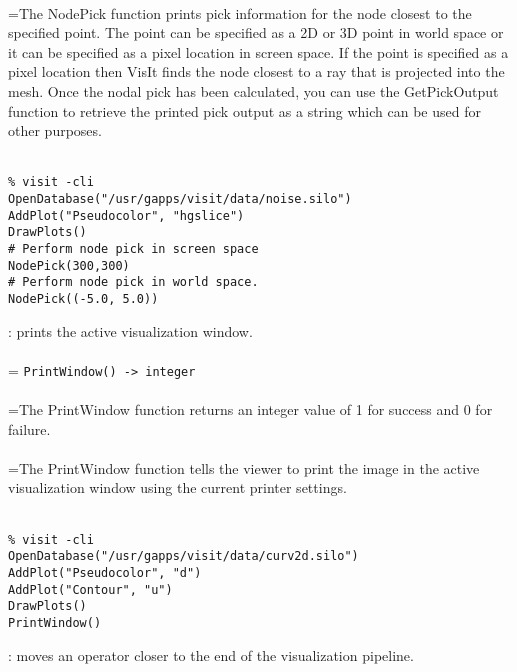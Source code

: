\documentclass[10pt,a4paper]{report}
\begin{document}
 \\ 
\hangindent=\parindent The NodePick function prints pick information for the node closest to the specified point. The point can be specified as a 2D or 3D point in world space or it can be specified as a pixel location in screen space. If the point is specified as a pixel location then VisIt finds the node closest to a ray that is projected into the mesh. Once the nodal pick has been calculated, you can use the GetPickOutput function to retrieve the printed pick output as a string which can be used for other purposes. \\[-3mm] 

\\[-6mm]
\begin{verbatim}% visit -cli
OpenDatabase("/usr/gapps/visit/data/noise.silo")
AddPlot("Pseudocolor", "hgslice")
DrawPlots()
# Perform node pick in screen space
NodePick(300,300)
# Perform node pick in world space.
NodePick((-5.0, 5.0))
\end{verbatim}
\newpage


{}
: prints the active visualization window.\\[-3mm]

 \\ 
\hangindent=\parindent 
\verb!PrintWindow() -> integer!\\ [-3mm]

 \\ 
\hangindent=\parindent The PrintWindow function returns an integer value of 1 for success and 0 for failure. \\[-3mm] 

 \\ 
\hangindent=\parindent The PrintWindow function tells the viewer to print the image in the active visualization window using the current printer settings. \\[-3mm] 

\\[-6mm]
\begin{verbatim}% visit -cli
OpenDatabase("/usr/gapps/visit/data/curv2d.silo")
AddPlot("Pseudocolor", "d")
AddPlot("Contour", "u")
DrawPlots()
PrintWindow()
\end{verbatim}
\newpage


{}
: moves an operator closer to the end of the visualization pipeline.\\[-3mm]
\end{document}
